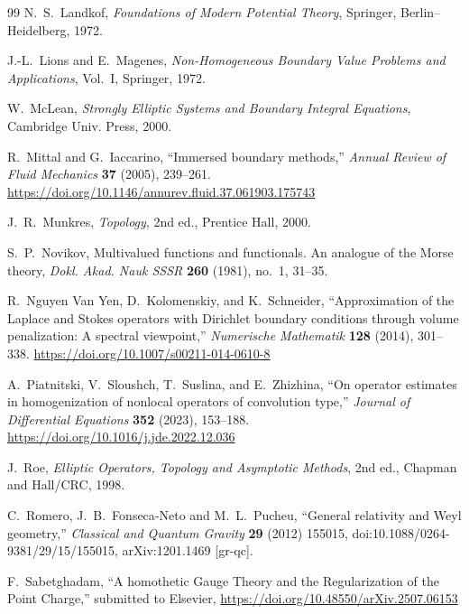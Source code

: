 \documentclass[preprint,12pt]{elsarticle}
\theoremstyle{plain}
\theoremstyle{definition}
\theoremstyle{note}
\begin{document}
\begin{thebibliography}{99}
N.~S.~Landkof,
\newblock \emph{Foundations of Modern Potential Theory},
\newblock Springer, Berlin--Heidelberg, 1972.

J.-L.~Lions and E.~Magenes,
\newblock \emph{Non-Homogeneous Boundary Value Problems and Applications}, Vol.~I,
\newblock Springer, 1972.

W.~McLean,
\newblock \emph{Strongly Elliptic Systems and Boundary Integral Equations},
\newblock Cambridge Univ. Press, 2000.

R.~Mittal and G.~Iaccarino,
\newblock ``Immersed boundary methods,''
\newblock \emph{Annual Review of Fluid Mechanics} \textbf{37} (2005), 239--261.
\newblock \url{https://doi.org/10.1146/annurev.fluid.37.061903.175743}

J.~R.~Munkres,
\newblock \emph{Topology}, 2nd ed.,
\newblock Prentice Hall, 2000.

S.~P.~Novikov,
\newblock Multivalued functions and functionals. An analogue of the Morse theory,
\newblock \emph{Dokl. Akad. Nauk SSSR} \textbf{260} (1981), no.~1, 31--35.

R.~Nguyen Van Yen, D.~Kolomenskiy, and K.~Schneider,
\newblock ``Approximation of the Laplace and Stokes operators with Dirichlet boundary conditions through volume penalization: A spectral viewpoint,''
\newblock \emph{Numerische Mathematik} \textbf{128} (2014), 301--338.
\newblock \url{https://doi.org/10.1007/s00211-014-0610-8}

A.~Piatnitski, V.~Sloushch, T.~Suslina, and E.~Zhizhina,
\newblock ``On operator estimates in homogenization of nonlocal operators of convolution type,''
\newblock \emph{Journal of Differential Equations} \textbf{352} (2023), 153--188.
\newblock \url{https://doi.org/10.1016/j.jde.2022.12.036}

J.~Roe,
\newblock \emph{Elliptic Operators, Topology and Asymptotic Methods}, 2nd ed.,
\newblock Chapman and Hall/CRC, 1998.

C.~Romero, J.~B.~Fonseca-Neto and M.~L.~Pucheu,
\newblock ``General relativity and Weyl geometry,''
\newblock \emph{Classical and Quantum Gravity} \textbf{29} (2012) 155015,
\newblock doi:10.1088/0264-9381/29/15/155015,
\newblock arXiv:1201.1469 [gr-qc].

F.~Sabetghadam,
\newblock ``A homothetic Gauge Theory and the Regularization of the Point Charge,''
\newblock submitted to Elsevier, \url{https://doi.org/10.48550/arXiv.2507.06153}


\end{thebibliography}
\end{document}
